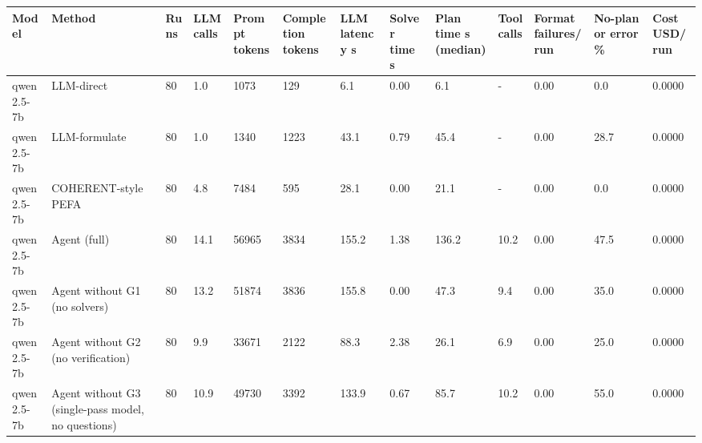 \begin{tabular}{lllllllllllll}
\toprule
Model & Method & Runs & LLM calls & Prompt tokens & Completion tokens & LLM latency s & Solver time s & Plan time s (median) & Tool calls & Format failures/run & No-plan or error \% & Cost USD/run \\
\midrule
qwen2.5-7b & LLM-direct & 80 & 1.0 & 1073 & 129 & 6.1 & 0.00 & 6.1 & - & 0.00 & 0.0 & 0.0000 \\
qwen2.5-7b & LLM-formulate & 80 & 1.0 & 1340 & 1223 & 43.1 & 0.79 & 45.4 & - & 0.00 & 28.7 & 0.0000 \\
qwen2.5-7b & COHERENT-style PEFA & 80 & 4.8 & 7484 & 595 & 28.1 & 0.00 & 21.1 & - & 0.00 & 0.0 & 0.0000 \\
qwen2.5-7b & Agent (full) & 80 & 14.1 & 56965 & 3834 & 155.2 & 1.38 & 136.2 & 10.2 & 0.00 & 47.5 & 0.0000 \\
qwen2.5-7b & Agent without G1 (no solvers) & 80 & 13.2 & 51874 & 3836 & 155.8 & 0.00 & 47.3 & 9.4 & 0.00 & 35.0 & 0.0000 \\
qwen2.5-7b & Agent without G2 (no verification) & 80 & 9.9 & 33671 & 2122 & 88.3 & 2.38 & 26.1 & 6.9 & 0.00 & 25.0 & 0.0000 \\
qwen2.5-7b & Agent without G3 (single-pass model, no questions) & 80 & 10.9 & 49730 & 3392 & 133.9 & 0.67 & 85.7 & 10.2 & 0.00 & 55.0 & 0.0000 \\
\bottomrule
\end{tabular}
